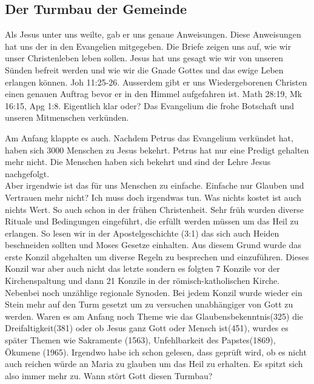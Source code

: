 \documentclass[14pt]{../../inc/mybib}
\begin{document}
    \subsection{Der Turmbau der Gemeinde}
    Als Jesus unter uns weilte, gab er uns genaue Anweisungen. Diese Anweisungen hat uns der \herr{} in den Evangelien mitgegeben. Die Briefe zeigen uns auf, wie wir unser Christenleben leben sollen. Jesus hat uns gesagt wie wir von unseren Sünden befreit werden und wie wir die Gnade Gottes und das ewige Leben erlangen können. Joh 11:25-26. Ausserdem gibt er uns Wiedergeborenen Christen einen genauen Auftrag bevor er in den Himmel aufgefahren ist. Math 28:19, Mk 16:15, Apg 1:8. Eigentlich klar oder? Das Evangelium die frohe Botschaft und unseren Mitmenschen verkünden.

    Am Anfang klappte es auch. Nachdem Petrus das Evangelium verkündet hat, haben sich 3000 Menschen zu Jesus bekehrt. Petrus hat nur eine Predigt gehalten mehr nicht. Die Menschen haben sich bekehrt und sind der Lehre Jesus nachgefolgt.\\
    Aber irgendwie ist das für uns Menschen zu einfache. Einfache nur Glauben und Vertrauen mehr nicht? Ich muss doch irgendwas tun. Was nichts kostet ist auch nichts Wert. So auch schon in der frühen Christenheit. Sehr früh wurden diverse Rituale und Bedingungen eingeführt, die erfüllt werden müssen um das Heil zu erlangen. So lesen wir in der Apostelgeschichte (3:1) das sich auch Heiden beschneiden sollten und Moses Gesetze einhalten. Aus diesem Grund wurde das erste Konzil abgehalten um diverse Regeln zu besprechen und einzuführen. Dieses Konzil war aber auch nicht das letzte sondern es folgten 7 Konzile vor der Kirchenspaltung und dann 21 Konzile in der römisch-katholischen Kirche. Nebenbei noch unzählige regionale Synoden. Bei jedem Konzil wurde wieder ein Stein mehr auf den Turm gesetzt um zu versuchen unabhängiger von Gott zu werden. Waren es am Anfang noch Theme wie das Glaubensbekenntnis(325) die Dreifaltigkeit(381) oder ob Jesus ganz Gott oder Mensch ist(451), wurdes es später Themen wie Sakramente (1563), Unfehlbarkeit des Papstes(1869), Ökumene (1965). Irgendwo habe ich schon gelesen, dass geprüft wird, ob es nicht auch reichen würde an Maria zu glauben um das Heil zu erhalten. Es spitzt sich also immer mehr zu. Wann stört Gott diesen Turmbau?
\end{document}

